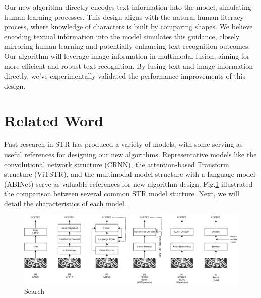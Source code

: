 \documentclass[runningheads]{llncs}
\begin{document}

Our new algorithm directly encodes text information into the model, simulating human learning processes.	This design aligns with the natural human literacy process, where knowledge of characters is built by comparing shapes.	We believe encoding textual information into the model simulates this guidance, closely mirroring human learning and potentially enhancing text recognition outcomes.	Our algorithm will leverage image information in multimodal fusion, aiming for more efficient and robust text recognition.	By fusing text and image information directly, we've experimentally validated the performance improvements of this design.	


\section{Related Word} \label{sec:relateword}
Past research in STR has produced a variety of models, with some serving as useful references for designing our new algorithms.	Representative models like the convolutional network structure (CRNN), the attention-based Transform structure (ViTSTR), and the multimodal model structure with a language model (ABINet) serve as valuable references for new algorithm design.	Fig.\ref{Fig:other_model_structure} illustrated the comparison between several common STR model sturture. Next, we will detail the characteristics of each model.	
\begin{figure}
  \centering
  \includegraphics[scale=0.15]{./images/other_model_structure.eps}
  \caption{Search}     \label{Fig:other_model_structure}
  \end{figure}
\end{document}
